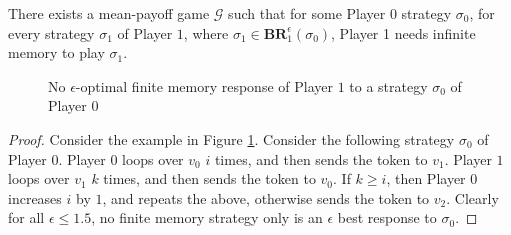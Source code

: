 \begin{theorem}
\label{ThmP1NeedInfMem}
There exists a mean-payoff game $\mathcal{G}$ such that for some Player $0$ strategy $\sigma_0$, for every strategy $\sigma_1$ of Player $1$, where $\sigma_1 \in \mathbf{BR}_1^{\epsilon}(\sigma_0)$, Player 1 needs infinite memory to play $\sigma_1$.
\end{theorem}
\begin{figure}
    \centering
    \caption{No $\epsilon$-optimal finite memory response of Player $1$ to a strategy $\sigma_0$ of Player $0$}
    \label{fig:no_optimal_response}
\end{figure}
\begin{proof}
Consider the example in Figure \ref{fig:no_optimal_response}.
Consider the following strategy $\sigma_0$ of Player $0$.
Player $0$ loops over $v_0$ $i$ times, and then sends the token to $v_1$.
Player $1$ loops over $v_1$ $k$ times, and then sends the token to $v_0$.
If $k \geqslant i$, then Player $0$ increases $i$ by $1$, and repeats the above, otherwise sends the token to $v_2$.
Clearly for all $\epsilon \leqslant 1.5$, no finite memory strategy only is an $\epsilon$ best response to $\sigma_0$.
\end{proof}